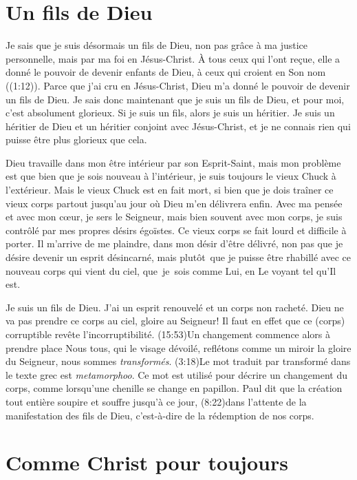 \section{Un fils de Dieu}

Je sais que je suis désormais un fils de Dieu,
 non pas grâce à ma justice personnelle,
 mais par ma foi en Jésus-Christ.
 \Og À tous ceux qui l'ont reçue, elle a donné le pouvoir
 de devenir enfants de Dieu,
 à ceux qui croient en Son nom \Fg{} ((1:12)).
 Parce que j'ai cru en Jésus-Christ, Dieu m'a donné le pouvoir
 de devenir un fils de Dieu.
 Je sais donc maintenant que je suis un fils de Dieu,
 et pour moi, c'est absolument glorieux.
 Si je suis un fils, alors je suis un héritier.
 Je suis un héritier de Dieu et un héritier conjoint avec Jésus-Christ,
 et je ne connais rien qui puisse être plus glorieux que cela.

Dieu travaille dans mon être intérieur par son Esprit-Saint,
 mais mon problème est que bien que je sois nouveau à l'intérieur,
 je suis toujours le vieux Chuck à l'extérieur.
 Mais le vieux Chuck est en fait mort, si bien que je dois traîner
 ce vieux corps partout jusqu'au jour où Dieu m'en délivrera enfin.
 Avec ma pensée et avec mon cœur, je sers le Seigneur,
 mais bien souvent avec mon corps,
 je suis contrôlé par mes propres désirs égoïstes.
 Ce vieux corps se fait lourd et difficile à porter.
 Il m'arrive de me plaindre, dans mon désir d'être délivré,
 non pas que je désire devenir un esprit désincarné,
 mais plutôt~que je puisse
 être rhabillé avec ce nouveau corps qui vient du ciel,
 que~je~sois comme Lui, en Le voyant tel qu'Il est.

Je suis un fils de Dieu. J'ai un esprit renouvelé et un corps non racheté.
 Dieu ne va pas prendre ce corps au ciel, gloire au Seigneur!
 \Og Il faut en effet que ce (corps) corruptible
 revête l'incorruptibilité. \Fg{}
 (15:53)Un changement
 commence alors à prendre place\frcolon{}
 \Og Nous tous, qui le visage dévoilé,
 reflétons comme un miroir la gloire du Seigneur,
 nous sommes \emph{transformés}. \Fg{}
 (3:18)Le mot traduit
 par \Og transformé \Fg{}
 dans le texte grec est \emph{metamorphoo}.
 Ce mot est utilisé pour décrire un changement du corps,
 comme lorsqu'une chenille se change en papillon.
 Paul dit que la création tout entière soupire et souffre
 jusqu'à ce jour, (8:22)dans l'attente
 de la manifestation des fils de Dieu,
 c'est-à-dire de la rédemption de nos corps.


\section{Comme Christ pour toujours}

